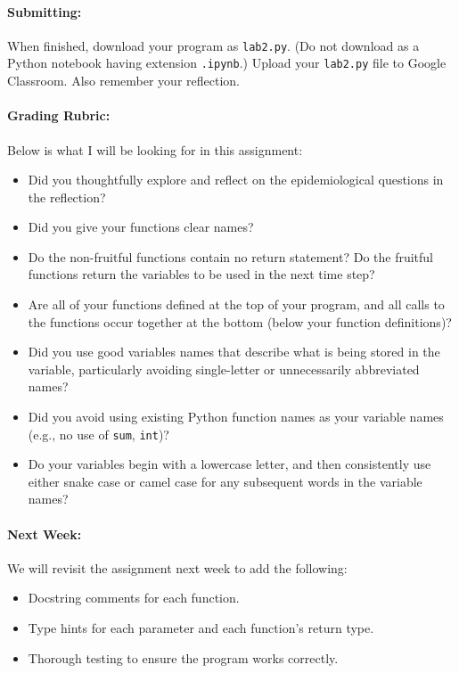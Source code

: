 \documentclass[10pt]{article}
\begin{document}
  \vspace*{-15pt}
  \paragraph{Submitting:} 
    When finished, download your program as {\tt lab2.py}.
    (Do not download as a Python notebook having extension {\tt .ipynb}.)
    Upload your {\tt lab2.py} file to Google Classroom.
    Also remember your reflection.

\paragraph{Grading Rubric:}  Below is what I will be looking for in this assignment:
    \begin{itemize}
        \setlength{\itemsep}{0pt}
        \item Did you thoughtfully explore and reflect on the epidemiological questions in the reflection?
        \item Did you give your functions clear names?
        \item Do the non-fruitful functions contain no return statement?
            Do the fruitful functions return the variables to be used in the next time step?

        \item Are all of your functions defined at the top of your program, and
           all calls to the functions occur together at the bottom (below your
           function definitions)?
        \item Did you use good variables names that describe what is being
            stored in the variable, particularly avoiding single-letter or
            unnecessarily abbreviated names?
        \item Did you avoid using existing Python function names as your
            variable names (e.g., no use of {\tt sum}, {\tt int})?
        \item Do your variables begin with a lowercase letter, and then
            consistently use either snake case or camel case for any
            subsequent words in the variable names?
        \end{itemize}

\paragraph{Next Week:}  We will revisit the assignment next week to add the following:

        \begin{itemize}
        \item Docstring comments for each function.
        \item Type hints for each parameter and each function's
            return type.
        \item Thorough testing to ensure the program works correctly.
    \end{itemize}
\end{document}
